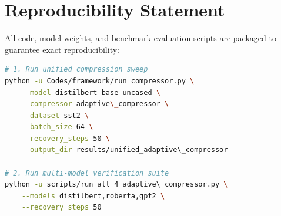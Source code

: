 \section{Reproducibility Statement}
All code, model weights, and benchmark evaluation scripts are packaged to guarantee exact reproducibility:
\begin{lstlisting}[language=bash]
# 1. Run unified compression sweep
python -u Codes/framework/run_compressor.py \
    --model distilbert-base-uncased \
    --compressor adaptive\_compressor \
    --dataset sst2 \
    --batch_size 64 \
    --recovery_steps 50 \
    --output_dir results/unified_adaptive\_compressor

# 2. Run multi-model verification suite
python -u scripts/run_all_4_adaptive\_compressor.py \
    --models distilbert,roberta,gpt2 \
    --recovery_steps 50
\end{lstlisting}

